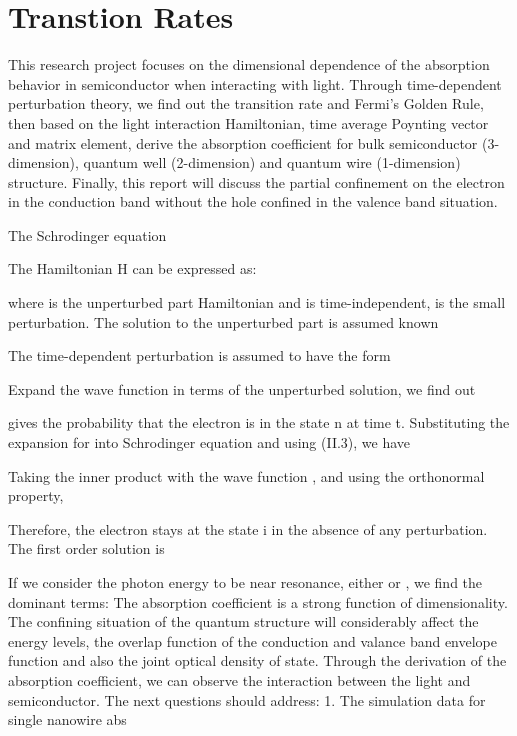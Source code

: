\chapter{Transtion Rates} \label{ch:mcmc}
This research project focuses on the dimensional dependence of the absorption behavior in semiconductor when interacting with light. Through time-dependent perturbation theory, we find out the transition rate and Fermi’s Golden Rule, then based on the light interaction Hamiltonian, time average Poynting vector and matrix element, derive the absorption coefficient for bulk semiconductor (3-dimension), quantum well (2-dimension) and quantum wire (1-dimension) structure.
Finally, this report will discuss the partial confinement on the electron in the conduction band without the hole confined in the valence band situation.

The Schrodinger equation

The Hamiltonian H can be expressed as:

where  is the unperturbed part Hamiltonian and is time-independent,  is the small perturbation.
The solution to the unperturbed part is assumed known

The time-dependent perturbation is assumed to have the form

Expand the wave function in terms of the unperturbed solution, we find out

gives the probability that the electron is in the state n at time t.
Substituting the expansion for into Schrodinger equation and using (II.3), we have

Taking the inner product with the wave function , and using the orthonormal property,

Therefore, the electron stays at the state i in the absence of any perturbation. The first order solution is 

If we consider the photon energy to be near resonance, either  or , we find the dominant terms:
The absorption coefficient is a strong function of dimensionality. The confining situation of the quantum structure will considerably affect the energy levels, the overlap function of the conduction and valance band envelope function and also the joint optical density of state.
Through the derivation of the absorption coefficient, we can observe the interaction between the light and semiconductor.
The next questions should address:
1. The simulation data for single nanowire abs



